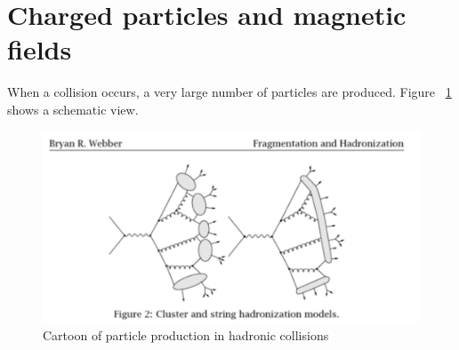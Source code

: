 \section{Charged particles and magnetic fields}

When a collision occurs, a very large number of particles are produced.  Figure ~\ref{fig:trk1} shows a schematic view.

\begin{figure}[h]
\centering\includegraphics[scale=0.5]{./Trackers/Pictures/fig1.pdf}
\caption{Cartoon of particle production in hadronic collisions}
\label{fig:trk1}
\end{figure}

